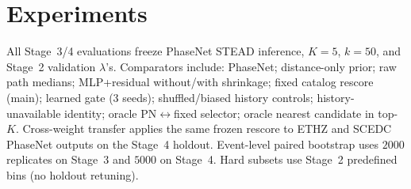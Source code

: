 \section{Experiments}
\label{sec:exp}

All Stage~3/4 evaluations freeze PhaseNet STEAD inference, $K{=}5$,
$k{=}50$, and Stage~2 validation $\lambda$'s.
Comparators include: PhaseNet; distance-only prior; raw path medians;
MLP+residual without/with shrinkage; fixed catalog rescore (main);
learned gate (3 seeds); shuffled/biased history controls; history-unavailable
identity; oracle PN$\leftrightarrow$fixed selector; oracle nearest candidate in
top-$K$.
Cross-weight transfer applies the same frozen rescore to ETHZ and SCEDC PhaseNet
outputs on the Stage~4 holdout.
Event-level paired bootstrap uses $2000$ replicates on Stage~3 and $5000$ on
Stage~4.
Hard subsets use Stage~2 predefined bins (no holdout retuning).

